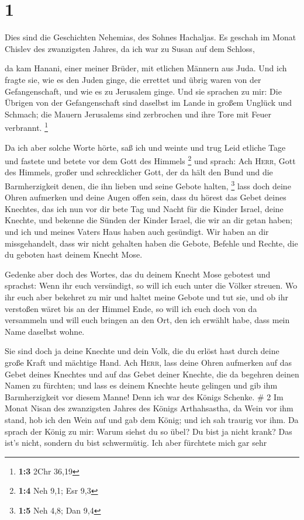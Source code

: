 \hypertarget{section}{%
\section{1}\label{section}}

 Dies sind die Geschichten Nehemias, des Sohnes Hachaljas.
Es geschah im Monat Chislev des zwanzigsten Jahres, da ich war zu Susan
auf dem Schloss,

 da kam Hanani, einer meiner Brüder, mit etlichen Männern
aus Juda. Und ich fragte sie, wie es den Juden ginge, die errettet und
übrig waren von der Gefangenschaft, und wie es zu Jerusalem ginge.
 Und sie sprachen zu mir: Die Übrigen von der
Gefangenschaft sind daselbst im Lande in großem Unglück und Schmach; die
Mauern Jerusalems sind zerbrochen und ihre Tore mit Feuer verbrannt.
\footnote{\textbf{1:3} 2Chr 36,19}

 Da ich aber solche Worte hörte, saß ich und weinte und
trug Leid etliche Tage und fastete und betete vor dem Gott des Himmels
\footnote{\textbf{1:4} Neh 9,1; Esr 9,3}  und sprach: Ach
\textsc{Herr}, Gott des Himmels, großer und schrecklicher Gott, der da
hält den Bund und die Barmherzigkeit denen, die ihn lieben und seine
Gebote halten, \footnote{\textbf{1:5} Neh 4,8; Dan 9,4} 
lass doch deine Ohren aufmerken und deine Augen offen sein, dass du
hörest das Gebet deines Knechtes, das ich nun vor dir bete Tag und Nacht
für die Kinder Israel, deine Knechte, und bekenne die Sünden der Kinder
Israel, die wir an dir getan haben; und ich und meines Vaters Haus haben
auch gesündigt.  Wir haben an dir missgehandelt, dass wir
nicht gehalten haben die Gebote, Befehle und Rechte, die du geboten hast
deinem Knecht Mose.

 Gedenke aber doch des Wortes, das du deinem Knecht Mose
gebotest und sprachst: Wenn ihr euch versündigt, so will ich euch unter
die Völker streuen.  Wo ihr euch aber bekehret zu mir und
haltet meine Gebote und tut sie, und ob ihr verstoßen wäret bis an der
Himmel Ende, so will ich euch doch von da versammeln und will euch
bringen an den Ort, den ich erwählt habe, dass mein Name daselbst wohne.

 Sie sind doch ja deine Knechte und dein Volk, die du
erlöst hast durch deine große Kraft und mächtige Hand. 
Ach \textsc{Herr}, lass deine Ohren aufmerken auf das Gebet deines
Knechtes und auf das Gebet deiner Knechte, die da begehren deinen Namen
zu fürchten; und lass es deinem Knechte heute gelingen und gib ihm
Barmherzigkeit vor diesem Manne! Denn ich war des Königs Schenke. \# 2
 Im Monat Nisan des zwanzigsten Jahres des Königs
Arthahsastha, da Wein vor ihm stand, hob ich den Wein auf und gab dem
König; und ich sah traurig vor ihm.  Da sprach der König
zu mir: Warum siehst du so übel? Du bist ja nicht krank? Das ist's
nicht, sondern du bist schwermütig. Ich aber fürchtete mich gar sehr

